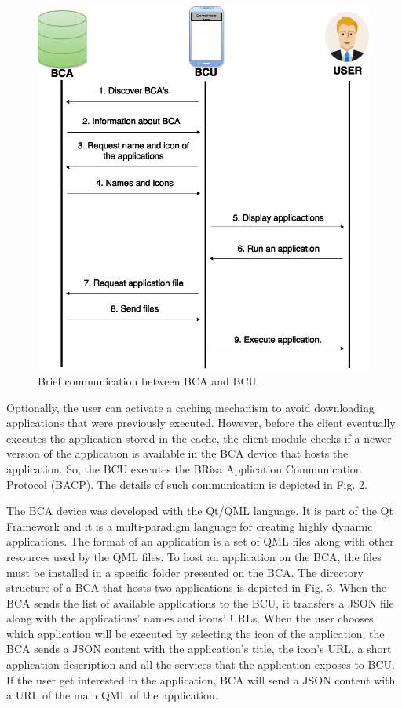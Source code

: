 \documentclass[journal]{IEEEtran}
\begin{document}
\begin{figure}[tb]
    \includegraphics[scale = 0.36]{FIG1}    
    \caption{Brief communication between BCA and BCU.}
\end{figure}

Optionally, the user can activate a caching mechanism to avoid downloading applications that were previously executed. However, before the client eventually executes the application stored in the cache, the client module checks if a newer version of the application is available in the BCA device that hosts the application. So, the BCU executes the BRisa Application Communication Protocol (BACP). The details of such communication  is depicted in Fig. 2.

The BCA device was developed with the Qt/QML language. It is part of the Qt Framework and it is a multi-paradigm language for creating highly dynamic applications. The format of an application is a set of QML files along with other resources used by the QML files. To host an application on the BCA, the files must be installed in a specific folder presented on the BCA. The directory structure of a BCA that hosts two applications is depicted in Fig. 3. When the BCA sends the list of available applications to the BCU, it transfers a JSON file along with the applications' names and icons' URLs. When the user chooses which application will be executed by selecting the icon of the application, the BCA sends a JSON content with the application's title, the icon's URL, a short application description and all the services that the application exposes to BCU. If the user get interested in the application, BCA will send a JSON content with a URL of the main QML of the application. 
\end{document}
